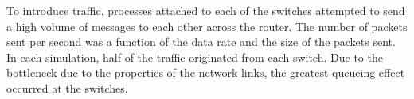 To introduce traffic, processes attached to each of the switches attempted to send a high volume of messages to each other across the router.
The number of packets sent per second was a function of the data rate and the size of the packets sent.
In each simulation, half of the traffic originated from each switch.
Due to the bottleneck due to the properties of the network links, the greatest queueing effect occurred at the switches.
